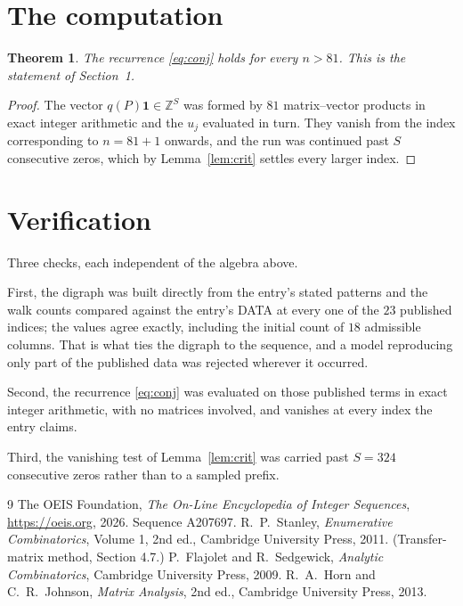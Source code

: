 \documentclass[11pt,a4paper]{article}
\theoremstyle{plain}
\newtheorem{theorem}{Theorem}
\theoremstyle{definition}
\begin{document}
\section{The computation}

\begin{theorem}
The recurrence \eqref{eq:conj} holds for every $n>81$. This is the statement of
Section~1.
\end{theorem}

\begin{proof}
The vector $q(P)\mathbf{1}\in\mathbb{Z}^{S}$ was formed by $81$ matrix--vector
products in exact integer arithmetic and the $u_j$ evaluated in turn. They vanish from the
index corresponding to $n=81+1$ onwards, and the run was continued past $S$ consecutive
zeros, which by Lemma~\ref{lem:crit} settles every larger index.
\end{proof}

\section{Verification}

Three checks, each independent of the algebra above.

First, the digraph was built directly from the entry's stated patterns and the walk counts
compared against the entry's DATA at every one of the $23$ published indices; the
values agree exactly, including the initial count of $18$ admissible columns. That is
what ties the digraph to the sequence, and a model reproducing only part of the published
data was rejected wherever it occurred.

Second, the recurrence \eqref{eq:conj} was evaluated on those published terms in exact
integer arithmetic, with no matrices involved, and vanishes at every index the entry claims.

Third, the vanishing test of Lemma~\ref{lem:crit} was carried past $S=324$ consecutive
zeros rather than to a sampled prefix.

\begin{thebibliography}{9}
 The OEIS Foundation, \emph{The On-Line Encyclopedia of Integer
Sequences}, \url{https://oeis.org}, 2026. Sequence A207697.
 R.~P.~Stanley, \emph{Enumerative Combinatorics}, Volume 1, 2nd ed.,
Cambridge University Press, 2011. (Transfer-matrix method, Section 4.7.)
 P.~Flajolet and R.~Sedgewick, \emph{Analytic Combinatorics}, Cambridge
University Press, 2009.
 R.~A.~Horn and C.~R.~Johnson, \emph{Matrix Analysis}, 2nd ed., Cambridge
University Press, 2013.
\end{thebibliography}
\end{document}
